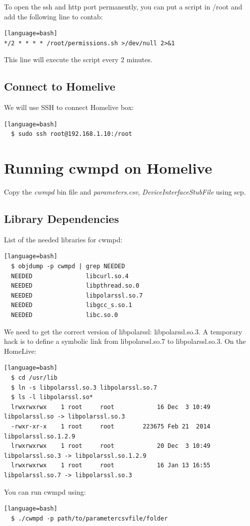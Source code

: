To open the ssh and http port permanently, you can put a script in /root and add the following line to contab:
\begin{lstlisting}[style=DOS][language=bash]
*/2 * * * * /root/permissions.sh >/dev/null 2>&1
\end{lstlisting}
This line will execute the script every 2 minutes.


\subsection{Connect to Homelive}
We will use SSH to connect Homelive box:
\begin{lstlisting}[style=DOS][language=bash]
  $ sudo ssh root@192.168.1.10:/root
\end{lstlisting}
\section{Running cwmpd on Homelive}
Copy the \textit{cwmpd} bin file and \textit{parameters.csv}, \textit{DeviceInterfaceStubFile} using scp.

\subsection{Library Dependencies}
List of the needed libraries for cwmpd:
\begin{lstlisting}[style=DOS][language=bash]
  $ objdump -p cwmpd | grep NEEDED
  NEEDED               libcurl.so.4
  NEEDED               libpthread.so.0
  NEEDED               libpolarssl.so.7
  NEEDED               libgcc_s.so.1
  NEEDED               libc.so.0
\end{lstlisting}

We need to get the correct version of libpolarssl: libpolarssl.so.3. A temporary hack is to define a symbolic link from libpolarssl.so.7 to libpolarssl.so.3. On the HomeLive:
\begin{lstlisting}[style=DOS][language=bash]
  $ cd /usr/lib
  $ ln -s libpolarssl.so.3 libpolarssl.so.7
  $ ls -l libpolarssl.so*
  lrwxrwxrwx    1 root     root            16 Dec  3 10:49 libpolarssl.so -> libpolarssl.so.3
  -rwxr-xr-x    1 root     root        223675 Feb 21  2014 libpolarssl.so.1.2.9
  lrwxrwxrwx    1 root     root            20 Dec  3 10:49 libpolarssl.so.3 -> libpolarssl.so.1.2.9
  lrwxrwxrwx    1 root     root            16 Jan 13 16:55 libpolarssl.so.7 -> libpolarssl.so.3
\end{lstlisting}


You can run cwmpd using:
\begin{lstlisting}[style=DOS][language=bash]
  $ ./cwmpd -p path/to/parametercsvfile/folder
\end{lstlisting}

